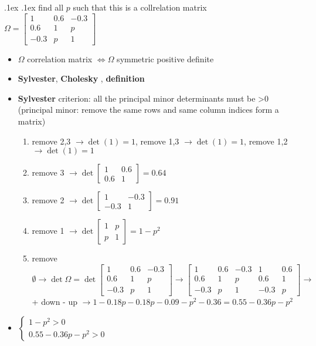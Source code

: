 \documentclass[10pt,landscape,a4paper]{article}
\makeatletter
\renewcommand{\section}{\@startsection{section}{1}{0mm}%
                                {.1ex}%
                                {.1ex}%
                                {\color{blue}\sffamily\small\bfseries}}
\makeatother
\begin{document}
\begin{multicols*}{4}
\begin{spacing}{0.1}
\section {find all $p$ such that this is a collrelation matrix} $\Omega = \begin{bmatrix} 1 & 0.6 & -0.3 \\  0.6 & 1 & p \\  -0.3 & p & 1 \end{bmatrix}$
\begin{itemize}
\item $\Omega$ correlation matrix $ \Leftrightarrow \Omega$ symmetric positive definite
\item \textbf{Sylvester}, \textbf{Cholesky} , \textbf{definition}
\item \textbf{Sylvester} criterion: all the principal minor determinants must be >0 (principal minor: remove the same rows  and same column indices form a matrix)
\begin{enumerate}
\item remove 2,3 $ \rightarrow \det (1) =1$, remove 1,3 $ \rightarrow  \det (1) =1$,  remove 1,2 $ \rightarrow  \det (1) =1$
\item remove 3 $\rightarrow \det \begin{bmatrix} 1 & 0.6 \\  0.6 & 1 \end{bmatrix} = 0.64$
\item remove 2 $\rightarrow \det \begin{bmatrix} 1 & -0.3 \\  -0.3 & 1 \end{bmatrix}=0.91$
\item remove 1 $\rightarrow \det \begin{bmatrix} 1 & p \\  p & 1 \end{bmatrix} = 1 -p^2$
\item remove $\emptyset \rightarrow \det \Omega =  \det \begin{bmatrix} 1 & 0.6 & -0.3 \\  0.6 & 1 & p \\  -0.3 & p & 1 \end{bmatrix}  \rightarrow \begin{bmatrix} 1 & 0.6 & -0.3  & 1 & 0.6 \\  0.6 & 1 & p & 0.6 & 1 \\  -0.3 & p & 1 & -0.3 & p \end{bmatrix} \rightarrow $ + down - up  $ \rightarrow 1 -0.18p -0.18p - 0.09 -p^2 -0.36 = 0.55 -0.36p -p^2$
\end{enumerate}
\item $\begin{cases} 1-p^2 > 0 \\ 0.55 -0.36p -p^2 >0 \end{cases}$
\end{itemize}


\end{spacing}
\end{multicols*}
\end{document}
